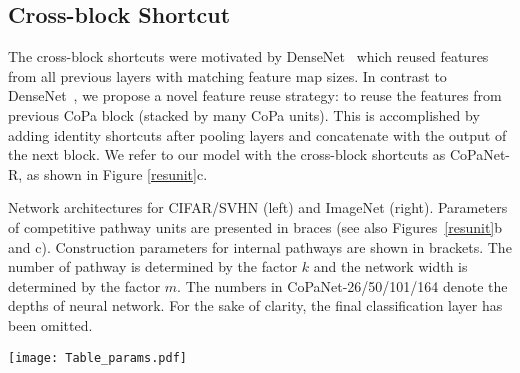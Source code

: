 \documentclass[wcp]{jmlr}
\begin{document}
\subsection{Cross-block Shortcut}
The cross-block shortcuts were motivated by DenseNet~\citep{huang2016densely} which reused features from all previous layers with matching feature map sizes.
In contrast to DenseNet~\citep{huang2016densely}, we propose a novel feature reuse strategy: to reuse the features from previous CoPa block (stacked by many CoPa units).
This is accomplished by adding identity shortcuts after pooling layers and concatenate with the output of the next block.
We refer to our model with the cross-block shortcuts as CoPaNet-R, as shown in Figure \ref{resunit}c.

\begin{table*}
\begin{center}
\caption{Network architectures for CIFAR/SVHN (left) and ImageNet (right). Parameters of competitive pathway units are presented in braces (see also Figures~\ref{resunit}b and c). Construction parameters for internal pathways are shown in brackets. The number of pathway is determined by the factor $k$ and the network width is determined by the factor $m$.  The numbers in CoPaNet-26/50/101/164 denote the depths of neural network. For the sake of clarity, the final classification layer has been omitted. }
\texttt{[image: Table\_params.pdf]}
\label{params}
\end{center}
\end{table*}
\end{document}
